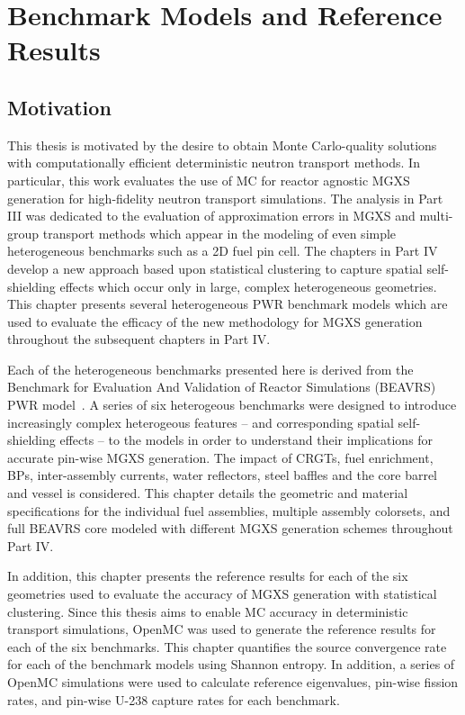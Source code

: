 \chapter{Benchmark Models and Reference Results}
\label{chap:benchmarks}

\section{Motivation}
\label{sec:chap7-motivate}

This thesis is motivated by the desire to obtain Monte Carlo-quality solutions with computationally efficient deterministic neutron transport methods. In particular, this work evaluates the use of \ac{MC} for reactor agnostic \ac{MGXS} generation for high-fidelity neutron transport simulations. The analysis in Part III was dedicated to the evaluation of approximation errors in \ac{MGXS} and multi-group transport methods which appear in the modeling of even simple heterogeneous benchmarks such as a 2D fuel pin cell. The chapters in Part IV develop a new approach based upon statistical clustering to capture spatial self-shielding effects which occur only in large, complex heterogeneous geometries. This chapter presents several heterogeneous \ac{PWR} benchmark models which are used to evaluate the efficacy of the new methodology for \ac{MGXS} generation throughout the subsequent chapters in Part IV.

Each of the heterogeneous benchmarks presented here is derived from the Benchmark for Evaluation And Validation of Reactor Simulations (BEAVRS) \ac{PWR} model~\cite{horelik2013beavrs}. A series of six heterogeous benchmarks were designed to introduce increasingly complex heterogeous features -- and corresponding spatial self-shielding effects -- to the models in order to understand their implications for accurate pin-wise \ac{MGXS} generation. The impact of \acp{CRGT}, fuel enrichment, \acp{BP}, inter-assembly currents, water reflectors, steel baffles and the core barrel and vessel is considered. This chapter details the geometric and material specifications for the individual fuel assemblies, multiple assembly colorsets, and full \ac{BEAVRS} core modeled with different \ac{MGXS} generation schemes throughout Part IV.

In addition, this chapter presents the reference results for each of the six geometries used to evaluate the accuracy of \ac{MGXS} generation with statistical clustering. Since this thesis aims to enable \ac{MC} accuracy in deterministic transport simulations, OpenMC was used to generate the reference results for each of the six benchmarks. This chapter quantifies the source convergence rate for each of the benchmark models using Shannon entropy. In addition, a series of OpenMC simulations were used to calculate reference eigenvalues, pin-wise fission rates, and pin-wise U-238 capture rates for each benchmark.

